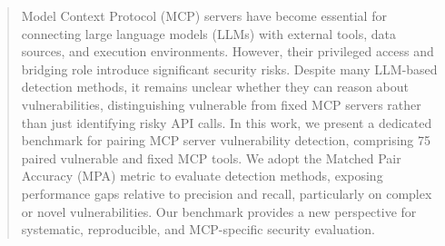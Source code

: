 

\begin{abstract}
Model Context Protocol (MCP) servers have become essential for connecting large language models (LLMs) with external tools, data sources, and execution environments. However, their privileged access and bridging role introduce significant security risks. Despite many LLM-based detection methods, it remains unclear whether they can reason about vulnerabilities, distinguishing vulnerable from fixed MCP servers rather than just identifying risky API calls. In this work, we present a dedicated benchmark for pairing MCP server vulnerability detection, comprising 75 paired vulnerable and fixed MCP tools. We adopt the Matched Pair Accuracy (MPA) metric to evaluate detection methods, exposing performance gaps relative to precision and recall, particularly on complex or novel vulnerabilities. Our benchmark provides a new perspective for systematic, reproducible, and MCP-specific security evaluation.

\end{abstract}